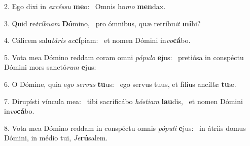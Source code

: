 2. Ego dixi in \textit{ex}\textit{cés}\textit{su} \textbf{me}o: \ast\  Omnis ho\textit{mo} \textbf{men}dax.\

3. Quid re\textit{trí}\textit{bu}\textit{am} \textbf{Dó}mino, \ast\  pro ómnibus, quæ retríbu\textit{it} \textbf{mi}hi?\

4. Cálicem salu\textit{tá}\textit{ris} \textit{ac}\textbf{cí}piam: \ast\  et nomen Dómini in\textit{vo}\textbf{cá}bo.\

5. Vota mea Dómino reddam coram omni \textit{pó}\textit{pu}\textit{lo} \textbf{e}jus: \ast\  pretiósa in conspéctu Dómini mors sanctó\textit{rum} \textbf{e}jus:\

6. O Dómine, quia e\textit{go} \textit{ser}\textit{vus} \textbf{tu}us: \ast\  ego servus tuus, et fílius ancíl\textit{læ} \textbf{tu}æ.\

7. Dirupísti víncula mea: \dag\  tibi sacrificábo \textit{hós}\textit{ti}\textit{am} \textbf{lau}dis, \ast\  et nomen Dómini in\textit{vo}\textbf{cá}bo.\

8. Vota mea Dómino reddam in conspéctu omnis \textit{pó}\textit{pu}\textit{li} \textbf{e}jus: \ast\  in átriis domus Dómini, in médio tui, \textit{Je}\textbf{rú}salem.\

